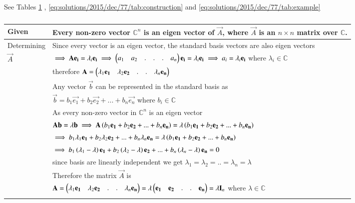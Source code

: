 See Tables     \ref{eq:solutions/2015/dec/77/tab:defs}
, \ref{eq:solutions/2015/dec/77/tab:construction} and 
    \ref{eq:solutions/2015/dec/77/tab:example}


\onecolumn
\begin{longtable}{|l|l|}
    \hline
    Given & Every non-zero vector $\mathbb{C}^n$ is an eigen vector of $\vec{A}$, where $\vec{A}$ is an $n\times n$ matrix over $\mathbb{C}$.\\
    \hline
    Determining &Since every vector is an eigen vector, the standard basis vectors are also eigen vectors\\
    $\vec{A}$&$\implies\mathbf{A}\mathbf{e_i}=\lambda_i\mathbf{e_i}\implies\begin{pmatrix}a_1&a_2&.&.&.&a_n\end{pmatrix}\mathbf{e_i}=\lambda_i\mathbf{e_i}\implies a_i=\lambda_i\mathbf{e_i}$ where $\lambda_i\in\mathbb{C}$\\
    & therefore $\mathbf{A}=\begin{pmatrix}\lambda_1\mathbf{e_1}&\lambda_2\mathbf{e_2}&.&.&\lambda_n\mathbf{e_n}\end{pmatrix}$\\
    & Any vector $\vec{b}$ can be represented in the standard basis as\\
    &$\vec{b}=b_1\vec{e_1}+b_2\vec{e_2}+...+b_n\vec{e_n}$ where $b_i \in \mathbb{C}$\\
    & As every non-zero vector in $\mathbb{C}^n$ is an eigen vector\\
    & $\mathbf{A}\mathbf{b}=\lambda\mathbf{b}\implies \mathbf{A}\left(b_1\mathbf{e_1}+b_2\mathbf{e_2}+...+b_n\mathbf{e_n}\right)=\lambda\left(b_1\mathbf{e_1}+b_2\mathbf{e_2}+...+b_n\mathbf{e_n}\right)$\\
    &$\implies b_1\lambda_1\mathbf{e_1}+b_2\lambda_2\mathbf{e_2}+...+b_n\lambda_n\mathbf{e_n}=\lambda\left(b_1\mathbf{e_1}+b_2\mathbf{e_2}+...+b_n\mathbf{e_n}\right)$\\
    &$\implies b_1\left(\lambda_1-\lambda\right)\mathbf{e_1}+b_2\left(\lambda_2-\lambda\right)\mathbf{e_2}+...+b_n\left(\lambda_n-\lambda\right)\mathbf{e_n}=0$\\
    & since basis are linearly independent we get $\lambda_1=\lambda_2=..=\lambda_n=\lambda$\\
    & Therefore the matrix $\vec{A}$ is\\
    &\qquad \qquad $\mathbf{A}=\begin{pmatrix}\lambda_1\mathbf{e_1}&\lambda_2\mathbf{e_2}&.&.&\lambda_n\mathbf{e_n}\end{pmatrix}=\lambda\begin{pmatrix}\mathbf{e_1}&\mathbf{e_2}&.&.&\mathbf{e_n}\end{pmatrix}=\lambda\mathbf{I}_n$ where $\lambda\in\mathbb{C}$\\
    \hline
\caption{}
\label{eq:solutions/2015/dec/77/tab:defs}
\end{longtable}
